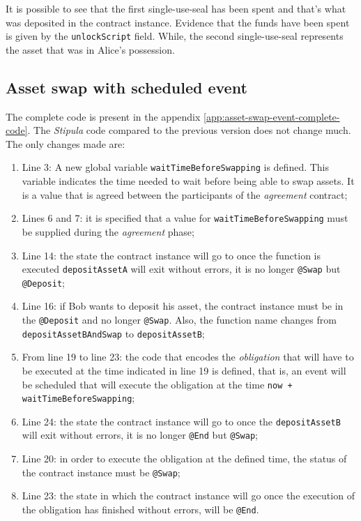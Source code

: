 It is possible to see that the first single-use-seal has been spent and that's what was deposited in the contract 
instance. Evidence that the funds have been spent is given by the \verb|unlockScript| field. While, the 
second single-use-seal represents the asset that was in Alice's possession.

\subsection{Asset swap with scheduled event}

The complete code is present in the appendix \ref{app:asset-swap-event-complete-code}. The 
\textit{Stipula} code compared to the previous version does not change much. The only changes made are:
\begin{enumerate}
  \item Line 3: A new global variable \verb|waitTimeBeforeSwapping| is defined. This variable indicates 
  the time needed to wait before being able to swap assets. It is a value that is agreed between the 
  participants of the \textit{agreement} contract;
  \item Lines 6 and 7: it is specified that a value for \verb|waitTimeBeforeSwapping| must be supplied 
  during the \textit{agreement} phase;
  \item Line 14: the state the contract instance will go to once the function is executed 
  \verb|depositAssetA| will exit without errors, it is no longer \verb|@Swap| but \verb|@Deposit|;
  \item Line 16: if Bob wants to deposit his asset, the contract instance must be in the \verb|@Deposit| 
  and no longer \verb|@Swap|. Also, the function name changes from \verb|depositAssetBAndSwap| to 
  \verb|depositAssetB|;
  \item From line 19 to line 23: the code that encodes the \textit{obligation} that will have to be 
  executed at the time indicated in line 19 is defined, that is, an event will be scheduled that will 
  execute the obligation at the time \verb|now + waitTimeBeforeSwapping|;
  \item Line 24: the state the contract instance will go to once the \verb|depositAssetB| will exit 
  without errors, it is no longer \verb|@End| but \verb|@Swap|;
  \item Line 20: in order to execute the obligation at the defined time, the status of the contract 
  instance must be \verb|@Swap|;
  \item Line 23: the state in which the contract instance will go once the execution of the obligation 
  has finished without errors, will be \verb|@End|.
\end{enumerate}

